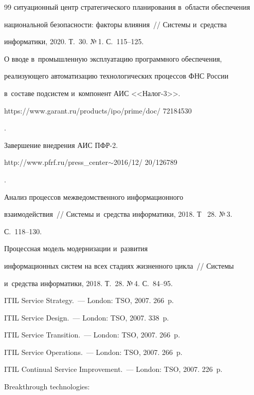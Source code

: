 {{\begin{thebibliography}{99}
ситуационный центр стратегического планирования в~области обеспечения 


национальной безопасности: факторы влияния~/\!\!/ Системы и~средства 


информатики, 2020. Т.~30. №\,1. С.~115--125.




О вводе в~промышленную эксплуатацию программного обеспечения, 


реализу\-юще\-го автоматизацию технологических процессов ФНС России 


в~составе под\-сис\-тем и~компонент АИС <<Налог-3>>. {\sf 


https://www.garant.ru/products/ipo/prime/doc/ 72184530}.




Завершение внедрения АИС ПФР-2. {\sf 


http://www.pfrf.ru/press\_center$\sim$2016/12/ 20/126789}.




 Анализ процессов межведомственного информационного 


взаимодействия~/\!\!/ Системы и~средства информатики, 2018. Т~ 28. №\,3. 


С.~118--130.




 Процессная модель модернизации и~развития 


информационных систем на всех стадиях жизненного цикла~/\!\!/ Системы 


и~средства информатики, 2018. Т.~28. №\,4. С.~84--95.




ITIL Service Strategy.~--- London: TSO, 2007. 266~p.




ITIL Service Design.~--- London: TSO, 2007. 338~p.




ITIL Service Transition.~--- London: TSO, 2007. 266~p.




ITIL Service Operations.~--- London: TSO, 2007. 266~p.




ITIL Continual Service Improvement.~--- London: TSO, 2007. 226~p.




 Breakthrough technologies: 



\end{thebibliography}}}

